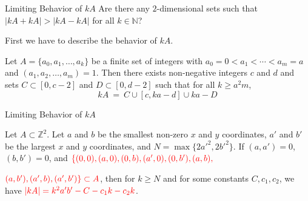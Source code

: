 \documentclass[11pt]{beamer}
\newcommand{\Z}{\mathbb{Z}}
\newcommand{\N}{\mathbb{N}}
\begin{document}

\begin{frame}{Limiting Behavior of $kA$}
Are there any $2$-dimensional sets such that $|kA+kA|>|kA-kA|$ for all  $k \in \N$? 

\pause

\bigskip
First we have to describe the behavior of $kA$.
\pause

\bigskip
\begin{theorem}[Nathanson]\label{Nathanson}
Let $A=\{a_0, a_1, \ldots, a_k\}$ be a finite set of integers with $a_0=0<a_1 < \cdots < a_m=a$ and $(a_1, a_2, \ldots, a_m)=1.$ Then there exists non-negative integers $c$ and $d$ and sets $C\subset [0, c-2]$ and $D\subset [0,d-2]$ such that for all $k \geq a^2m$, $$kA \ = \ C \cup [c, ka-d] \cup ka-D$$
\end{theorem}

\end{frame}


\begin{frame}{Limiting Behavior of $kA$}

\begin{theorem} \label{growth of kA-1}
Let $A\subset \Z^2$. Let $a$ and $b$ be the smallest non-zero $x$ and $y$ coordinates, $a'$ and $b'$ be the largest $x$ and $y$ coordinates, and $N=\max\{2a'^2, 2b'^2\}$. If $(a, a')=0$, $(b,b')=0$, and $\color{red}\{(0,0), (a,0), (0,b), (a',0),(0,b'),(a,b),$

$\color{red} (a,b'),(a',b), (a',b') \} \subset A$,  then for $k \geq N$  and for some constants $C, c_1, c_2$, we have $\color{red}|kA|=k^2a'b' -C-c_1k -c_2k$. 
\end{theorem}

\end{frame}

\end{document}
